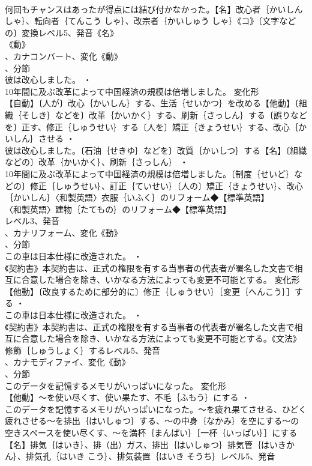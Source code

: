 \documentclass[8pt]{extreport}
\begin{document}
\begin{CJK}{UTF8}{min}
\\	何回もチャンスはあったが得点には結び付かなかった。【名】改心者｛かいしん しゃ｝、転向者｛てんこう しゃ｝、改宗者｛かいしゅう しゃ｝《コ》〔文字などの〕変換レベル5、発音《名》
\\	《動》
\\	、カナコンバート、変化《動》
\\	、分節
\\	彼は改心しました。 ・
\\	10年間に及ぶ改革によって中国経済の規模は倍増しました。	変化形 
\\	【自動】〔人が〕改心｛かいしん｝する、生活｛せいかつ｝を改める【他動】〔組織｛そしき｝などを〕改革｛かいかく｝する、刷新｛さっしん｝する〔誤りなどを〕正す、修正｛しゅうせい｝する〔人を〕矯正｛きょうせい｝する、改心｛かいしん｝させる ・
\\	彼は改心しました。〔石油｛せきゆ｝などを〕改質｛かいしつ｝する【名】〔組織などの〕改革｛かいかく｝、刷新｛さっしん｝ ・
\\	10年間に及ぶ改革によって中国経済の規模は倍増しました。〔制度｛せいど｝などの〕修正｛しゅうせい｝、訂正｛ていせい｝〔人の〕矯正｛きょうせい｝、改心｛かいしん｝〈和製英語〉衣服｛いふく｝のリフォーム◆【標準英語】
\\	〈和製英語〉建物｛たてもの｝のリフォーム◆【標準英語】
\\	レベル3、発音
\\	、カナリフォーム、変化《動》
\\	、分節
\\	この車は日本仕様に改造された。 ・
\\	《契約書》本契約書は、正式の権限を有する当事者の代表者が署名した文書で相互に合意した場合を除き、いかなる方法によっても変更不可能とする。	変化形 
\\	【他動】〔改良するために部分的に〕修正｛しゅうせい｝［変更｛へんこう｝］する ・
\\	この車は日本仕様に改造された。 ・
\\	《契約書》本契約書は、正式の権限を有する当事者の代表者が署名した文書で相互に合意した場合を除き、いかなる方法によっても変更不可能とする。《文法》修飾｛しゅうしょく｝するレベル5、発音
\\	、カナモディファイ、変化《動》
\\	、分節
\\	このデータを記憶するメモリがいっぱいになった。	変化形 
\\	【他動】～を使い尽くす、使い果たす、不毛｛ふもう｝にする ・
\\	このデータを記憶するメモリがいっぱいになった。～を疲れ果てさせる、ひどく疲れさせる～を排出｛はいしゅつ｝する、～の中身｛なかみ｝を空にする～の空きスペースを使い尽くす、～を満杯｛まんぱい｝［一杯｛いっぱい｝］にする【名】排気｛はいき｝、排（出）ガス、排出｛はいしゅつ｝排気管｛はいきかん｝、排気孔｛はいき こう｝、排気装置｛はいき そうち｝レベル5、発音

\end{CJK}
\end{document}
